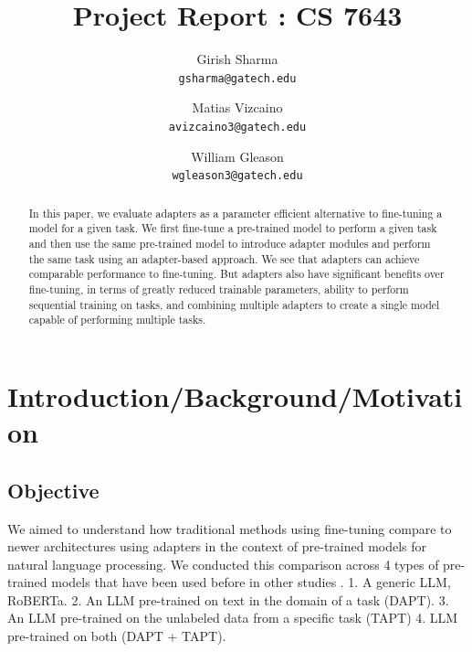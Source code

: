 \documentclass[10pt,twocolumn,letterpaper]{article}
\begin{document}
\title{Project Report : CS 7643}

\author{Girish Sharma\\
{\tt\small gsharma@gatech.edu}
\and
Matias Vizcaino \\
{\tt\small avizcaino3@gatech.edu}
\and
William Gleason\\
{\tt\small wgleason3@gatech.edu}
}

\maketitle

\begin{abstract}
   In this paper, we evaluate adapters as a parameter efficient alternative to fine-tuning a model for a given task. We first fine-tune a pre-trained model to perform a given task and then use the same pre-trained model to introduce adapter modules and perform the same task using an adapter-based approach. We see that adapters can achieve comparable performance to fine-tuning. But adapters also have significant benefits over fine-tuning, in terms of greatly reduced trainable parameters, ability to perform sequential training on tasks, and combining multiple adapters to create a single model capable of performing multiple tasks.
\end{abstract}

\section{Introduction/Background/Motivation}

\subsection{Objective} We aimed to understand how traditional methods using fine-tuning compare to newer architectures using adapters in the context of pre-trained models for natural language processing. We conducted this comparison across 4 types of pre-trained models that have been used before in other studies \cite{gururangan2020dont}. 1. A generic LLM, RoBERTa. 2. An LLM pre-trained on text in the domain of a task (DAPT). 3. An LLM pre-trained on the unlabeled data from a specific task (TAPT) 4. LLM pre-trained on both (DAPT + TAPT). 
\end{document}
